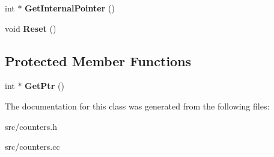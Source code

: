 \begin{DoxyCompactItemize}
\item 
\hypertarget{classv8_1_1internal_1_1_stats_counter_a4f90a518642c3bcdc8e5aff05824c3bb}{}int $\ast$ {\bfseries Get\+Internal\+Pointer} ()\label{classv8_1_1internal_1_1_stats_counter_a4f90a518642c3bcdc8e5aff05824c3bb}

\item 
\hypertarget{classv8_1_1internal_1_1_stats_counter_ab65f7bdc9e5dc828bd375b942a5269e6}{}void {\bfseries Reset} ()\label{classv8_1_1internal_1_1_stats_counter_ab65f7bdc9e5dc828bd375b942a5269e6}

\end{DoxyCompactItemize}
\subsection*{Protected Member Functions}
\begin{DoxyCompactItemize}
\item 
\hypertarget{classv8_1_1internal_1_1_stats_counter_a90c8a4714496542e2e6230b4bbfdbe77}{}int $\ast$ {\bfseries Get\+Ptr} ()\label{classv8_1_1internal_1_1_stats_counter_a90c8a4714496542e2e6230b4bbfdbe77}

\end{DoxyCompactItemize}


The documentation for this class was generated from the following files\+:\begin{DoxyCompactItemize}
\item 
src/counters.\+h\item 
src/counters.\+cc\end{DoxyCompactItemize}
